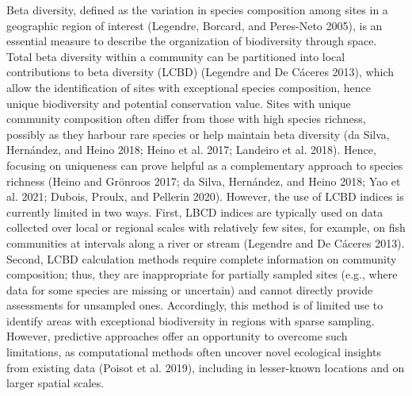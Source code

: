 \documentclass[10pt,oneside]{article}
\begin{document}
Beta diversity, defined as the variation in species composition among
sites in a geographic region of interest (Legendre, Borcard, and
Peres-Neto 2005), is an essential measure to describe the organization
of biodiversity through space. Total beta diversity within a community
can be partitioned into local contributions to beta diversity (LCBD)
(Legendre and De Cáceres 2013), which allow the identification of sites
with exceptional species composition, hence unique biodiversity and
potential conservation value. Sites with unique community composition
often differ from those with high species richness, possibly as they
harbour rare species or help maintain beta diversity (da Silva,
Hernández, and Heino 2018; Heino et al. 2017; Landeiro et al. 2018).
Hence, focusing on uniqueness can prove helpful as a complementary
approach to species richness (Heino and Grönroos 2017; da Silva,
Hernández, and Heino 2018; Yao et al. 2021; Dubois, Proulx, and Pellerin
2020). However, the use of LCBD indices is currently limited in two
ways. First, LBCD indices are typically used on data collected over
local or regional scales with relatively few sites, for example, on fish
communities at intervals along a river or stream (Legendre and De
Cáceres 2013). Second, LCBD calculation methods require complete
information on community composition; thus, they are inappropriate for
partially sampled sites (e.g., where data for some species are missing
or uncertain) and cannot directly provide assessments for unsampled
ones. Accordingly, this method is of limited use to identify areas with
exceptional biodiversity in regions with sparse sampling. However,
predictive approaches offer an opportunity to overcome such limitations,
as computational methods often uncover novel ecological insights from
existing data (Poisot et al. 2019), including in lesser-known locations
and on larger spatial scales.
\end{document}
